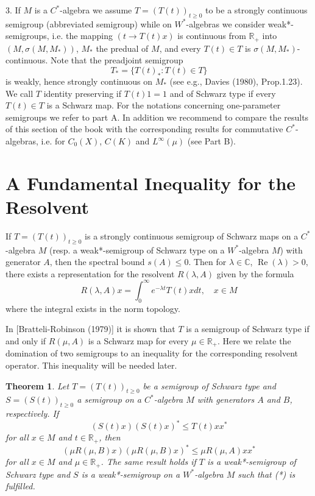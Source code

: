 \documentclass[a4paper, fontsize=11pt, oneside]{scrbook}
\newtheorem{theorem}{Theorem}[section]
\begin{document}
3. If $M$ is a $C^{*}$-algebra we assume $T = (T(t))_{t \geq 0}$ to be a strongly continuous semigroup (abbreviated semigroup) while on $W^{*}$-algebras we consider weak*-semigroups, i.e. the mapping $(t \rightarrow T(t)x)$ is continuous from $\mathbb{R}_{+}$ into $(M, \sigma(M, M_{*}))$, $M_{*}$ the predual of $M$, and every $T(t) \in T$ is $\sigma(M, M_{*})$-continuous.
Note that the preadjoint semigroup
\[
T_{*} = \{T(t)_{*} : T(t) \in T\}
\]
is weakly, hence strongly continuous on $M_{*}$ (see e.g., Davies (1980), Prop.1.23).
We call $T$ identity preserving if $T(t)1 = 1$ and of Schwarz type if every $T(t) \in T$ is a Schwarz map.
For the notations concerning one-parameter semigroups we refer to part A.
In addition we recommend to compare the results of this section of the book with the corresponding results for commutative $C^{*}$-algebras, i.e. for $C_0(X)$, $C(K)$ and $L^\infty(\mu)$ (see Part B).

\section{A Fundamental Inequality for the Resolvent}

If $T=(T(t))_{t \geq 0}$ is a strongly continuous semigroup of Schwarz maps on a $C^{*}$-algebra $M$ (resp. a weak*-semigroup of Schwarz type on a $W^{*}$-algebra $M$) with generator $A$, then the spectral bound $s(A) \leq 0$.
Then for $\lambda \in \mathbb{C}$, $\operatorname{Re}(\lambda)>0$, there exists a representation for the resolvent $R(\lambda, A)$ given by the formula
\[
R(\lambda, A)x = \int_{0}^{\infty} e^{-\lambda t} T(t)x dt, \quad x \in M
\]
where the integral exists in the norm topology.

In [Bratteli-Robinson (1979)] it is shown that $T$ is a semigroup of Schwarz type if and only if $R(\mu, A)$ is a Schwarz map for every $\mu \in \mathbb{R}_{+}$.
Here we relate the domination of two semigroups to an inequality for the corresponding resolvent operator.
This inequality will be needed later.
\begin{theorem}
Let $T=(T(t))_{t \geq 0}$ be a semigroup of Schwarz type and $S=(S(t))_{t \geq 0}$ a semigroup on a $C^{*}$-algebra $M$ with generators $A$ and $B$, respectively.
If 
\[
(S(t)x)(S(t)x)^{*} \leq T(t)xx^{*}
\]
for all $x \in M$ and $t \in \mathbb{R}_{+}$, then
\[
(\mu R(\mu, B)x)(\mu R(\mu, B)x)^{*} \leq \mu R(\mu, A)xx^{*}
\]
for all $x \in M$ and $\mu \in \mathbb{R}_{+}$.
The same result holds if $T$ is a weak*-semigroup of Schwarz type and $S$ is a weak*-semigroup on a $W^{*}$-algebra $M$ such that (*) is fulfilled.
\end{theorem}
\end{document}
